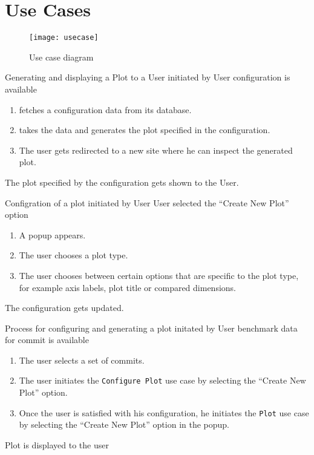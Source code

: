 \section{Use Cases}

\begin{figure}[H]
    \texttt{[image: usecase]}
    \caption{Use case diagram}
    \label{fig:usecase}
\end{figure}

{Generating and displaying a Plot to a User}
{initiated by User}
{\gls{configuration} is available}
{\begin{enumerate}
    \item \parkview{} fetches a \gls{configuration} data from its database.
    \item \parkview{} takes the data and generates the plot specified in the \gls{configuration}.
    \item The user gets redirected to a new site where he can inspect the generated \gls{plot}.
\end{enumerate}}
{The plot specified by the \gls{configuration} gets shown to the User.}

\bigskip

{Configration of a \gls{plot}}
{initiated by User}
{User selected the \enquote{Create New Plot} option}
{\begin{enumerate}
    \item A popup appears.
    \item The user chooses a \gls{plot} type.
    \item The user chooses between certain options that are specific to the plot type, for example axis labels, plot title or compared dimensions.
\end{enumerate}}
{The \gls{configuration} gets updated.}

\bigskip

{Process for configuring and generating a plot}
{initated by User}
{benchmark data for commit is available}
{\begin{enumerate}
    \item The user selects a set of commits.
    \item The user initiates the \texttt{Configure Plot} use case by selecting the \enquote{Create New Plot} option.
    \item Once the user is satisfied with his \gls{configuration}, he initiates the \texttt{Plot} use case by selecting the \enquote{Create New Plot} option in the popup.
\end{enumerate}}
{Plot is displayed to the user}

